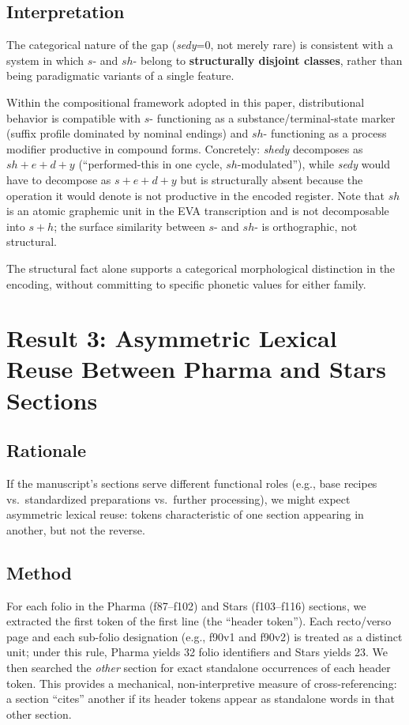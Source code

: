 \documentclass[11pt,a4paper]{article}
\begin{document}
\subsection{Interpretation}

The categorical nature of the gap (\textit{sedy}=0, not merely rare) is consistent with a system in which $s$- and $sh$- belong to \textbf{structurally disjoint classes}, rather than being paradigmatic variants of a single feature.

Within the compositional framework adopted in this paper, distributional behavior is compatible with $s$- functioning as a substance/terminal-state marker (suffix profile dominated by nominal endings) and $sh$- functioning as a process modifier productive in compound forms. Concretely: \textit{shedy} decomposes as $sh + e + d + y$ (``performed-this in one cycle, $sh$-modulated''), while \textit{sedy} would have to decompose as $s + e + d + y$ but is structurally absent because the operation it would denote is not productive in the encoded register. Note that $sh$ is an atomic graphemic unit in the EVA transcription and is not decomposable into $s + h$; the surface similarity between $s$- and $sh$- is orthographic, not structural.

The structural fact alone supports a categorical morphological distinction in the encoding, without committing to specific phonetic values for either family.

\section{Result 3: Asymmetric Lexical Reuse Between Pharma and Stars Sections}

\subsection{Rationale}

If the manuscript's sections serve different functional roles (e.g., base recipes vs.\ standardized preparations vs.\ further processing), we might expect asymmetric lexical reuse: tokens characteristic of one section appearing in another, but not the reverse.

\subsection{Method}

For each folio in the Pharma (f87--f102) and Stars (f103--f116) sections, we extracted the first token of the first line (the ``header token''). Each recto/verso page and each sub-folio designation (e.g., f90v1 and f90v2) is treated as a distinct unit; under this rule, Pharma yields 32 folio identifiers and Stars yields 23. We then searched the \textit{other} section for exact standalone occurrences of each header token. This provides a mechanical, non-interpretive measure of cross-referencing: a section ``cites'' another if its header tokens appear as standalone words in that other section.
\end{document}
